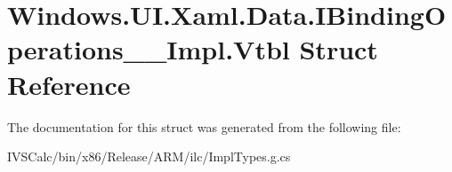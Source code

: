 \hypertarget{struct_windows_1_1_u_i_1_1_xaml_1_1_data_1_1_i_binding_operations_____impl_1_1_vtbl}{}\section{Windows.\+U\+I.\+Xaml.\+Data.\+I\+Binding\+Operations\+\_\+\+\_\+\+Impl.\+Vtbl Struct Reference}
\label{struct_windows_1_1_u_i_1_1_xaml_1_1_data_1_1_i_binding_operations_____impl_1_1_vtbl}


The documentation for this struct was generated from the following file\+:\begin{DoxyCompactItemize}
\item 
I\+V\+S\+Calc/bin/x86/\+Release/\+A\+R\+M/ilc/Impl\+Types.\+g.\+cs\end{DoxyCompactItemize}
